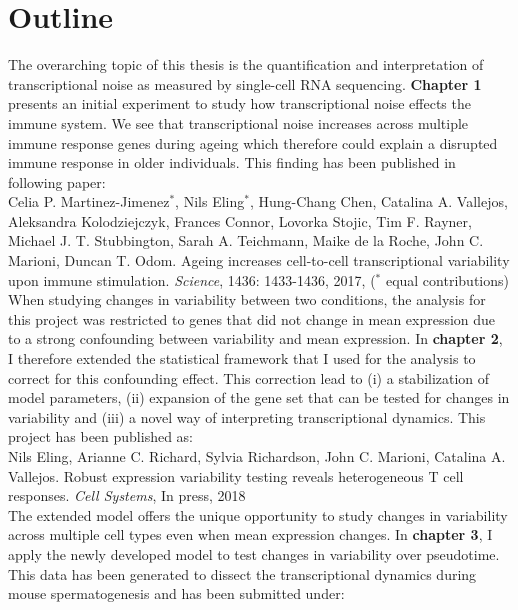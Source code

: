 

\section{Outline}

The overarching topic of this thesis is the quantification and interpretation of transcriptional noise as measured by single-cell RNA sequencing. \textbf{Chapter 1} presents an initial experiment to study how  transcriptional noise effects the immune system. We see that transcriptional noise increases across multiple immune response genes during ageing which therefore could explain a disrupted immune response in older individuals. This finding has been published in following paper:\\

Celia P. Martinez-Jimenez$^\ast$, Nils  Eling$^\ast$, Hung-Chang Chen, Catalina A. Vallejos, Aleksandra Kolodziejczyk, Frances Connor, Lovorka Stojic, Tim F. Rayner, Michael J. T. Stubbington, Sarah A. Teichmann, Maike de la Roche, John C. Marioni, Duncan T. Odom. Ageing increases cell-to-cell transcriptional variability upon immune stimulation. \emph{Science}, 1436: 1433-1436, 2017, ($^\ast$ equal contributions) \\

When studying changes in variability between two conditions, the analysis for this project was restricted to genes that did not change in mean expression due to a strong confounding between variability and mean expression. In \textbf{chapter 2}, I therefore extended the statistical framework that I used for the analysis to correct for this confounding effect. This correction lead to (i) a stabilization of model parameters, (ii) expansion of the gene set that can be tested for changes in variability and (iii) a novel way of interpreting transcriptional dynamics. This project has been published as:\\

Nils Eling, Arianne C. Richard, Sylvia Richardson, John C. Marioni, Catalina A. Vallejos. Robust expression variability testing reveals heterogeneous T cell responses. \emph{Cell Systems}, In press, 2018 \\

The extended model offers the unique opportunity to study changes in variability across multiple cell types even when mean expression changes. In \textbf{chapter 3}, I apply the newly developed model to test changes in variability over pseudotime. This data has been generated to dissect the transcriptional dynamics during mouse spermatogenesis and has been submitted under: \\


